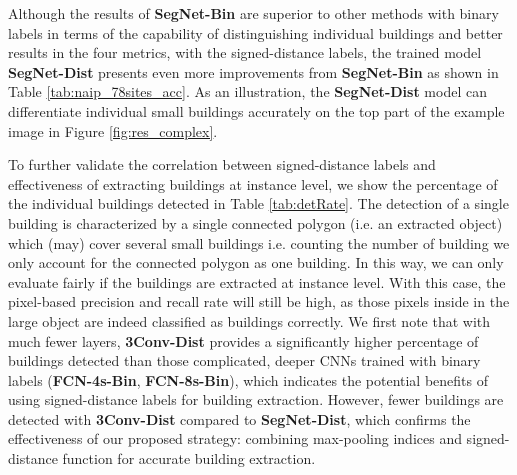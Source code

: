 \documentclass[journal]{IEEEtran}
\begin{document}
Although the results of \textbf{SegNet-Bin} are superior to other methods with binary labels in terms of the capability of distinguishing individual buildings and better results in the four metrics, with the signed-distance labels, the trained model \textbf{SegNet-Dist} presents even more improvements from \textbf{SegNet-Bin} as shown in Table \ref{tab:naip_78sites_acc}. As an illustration, the \textbf{SegNet-Dist} model can differentiate individual small buildings accurately on the top part of the example image in Figure \ref{fig:res_complex}.

To further validate the correlation between signed-distance labels and effectiveness of extracting buildings at instance level, we show the percentage of the individual buildings detected in Table \ref{tab:detRate}. The detection of a single building is characterized by a single connected polygon (i.e. an extracted object) which (may) cover several small buildings i.e. counting the number of building we only account for the connected polygon as one building. In this way, we can only evaluate fairly if the buildings are extracted at instance level. With this case, the pixel-based precision and recall rate will still be high, as those pixels inside in the large object are indeed classified as buildings correctly.
We first note that with much fewer layers, \textbf{3Conv-Dist} provides a significantly higher percentage of buildings detected than those complicated, deeper CNNs trained with binary labels (\textbf{FCN-4s-Bin}, \textbf{FCN-8s-Bin}), which indicates the potential benefits of using signed-distance labels for building extraction. However, fewer buildings are detected with \textbf{3Conv-Dist} compared to \textbf{SegNet-Dist}, which confirms the effectiveness of our proposed strategy: combining max-pooling indices and signed-distance function for accurate building extraction.
\end{document}
